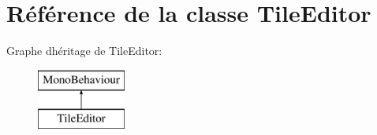 \hypertarget{class_tile_editor}{}\section{Référence de la classe Tile\+Editor}
\label{class_tile_editor}
Graphe d\textquotesingle{}héritage de Tile\+Editor\+:\begin{figure}[H]
\begin{center}
\leavevmode
\includegraphics[height=2.000000cm]{class_tile_editor}
\end{center}
\end{figure}
